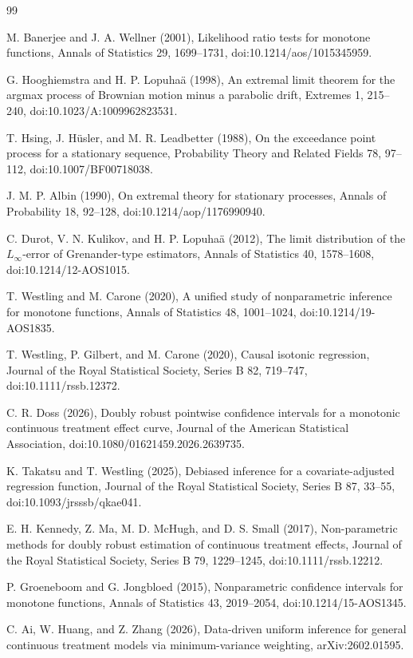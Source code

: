 \documentclass{article}
\begin{document}
\begin{thebibliography}{99}

   M. Banerjee and J. A. Wellner (2001), Likelihood ratio tests for monotone functions, Annals of Statistics 29, 1699--1731, doi:10.1214/aos/1015345959.

   G. Hooghiemstra and H. P. Lopuhaä (1998), An extremal limit theorem for the argmax process of Brownian motion minus a parabolic drift, Extremes 1, 215--240, doi:10.1023/A:1009962823531.

   T. Hsing, J. Hüsler, and M. R. Leadbetter (1988), On the exceedance point process for a stationary sequence, Probability Theory and Related Fields 78, 97--112, doi:10.1007/BF00718038.

   J. M. P. Albin (1990), On extremal theory for stationary processes, Annals of Probability 18, 92--128, doi:10.1214/aop/1176990940.

   C. Durot, V. N. Kulikov, and H. P. Lopuhaä (2012), The limit distribution of the \(L_{\infty}\)-error of Grenander-type estimators, Annals of Statistics 40, 1578--1608, doi:10.1214/12-AOS1015.

   T. Westling and M. Carone (2020), A unified study of nonparametric inference for monotone functions, Annals of Statistics 48, 1001--1024, doi:10.1214/19-AOS1835.

   T. Westling, P. Gilbert, and M. Carone (2020), Causal isotonic regression, Journal of the Royal Statistical Society, Series B 82, 719--747, doi:10.1111/rssb.12372.

   C. R. Doss (2026), Doubly robust pointwise confidence intervals for a monotonic continuous treatment effect curve, Journal of the American Statistical Association, doi:10.1080/01621459.2026.2639735.

   K. Takatsu and T. Westling (2025), Debiased inference for a covariate-adjusted regression function, Journal of the Royal Statistical Society, Series B 87, 33--55, doi:10.1093/jrsssb/qkae041.

   E. H. Kennedy, Z. Ma, M. D. McHugh, and D. S. Small (2017), Non-parametric methods for doubly robust estimation of continuous treatment effects, Journal of the Royal Statistical Society, Series B 79, 1229--1245, doi:10.1111/rssb.12212.

   P. Groeneboom and G. Jongbloed (2015), Nonparametric confidence intervals for monotone functions, Annals of Statistics 43, 2019--2054, doi:10.1214/15-AOS1345.

   C. Ai, W. Huang, and Z. Zhang (2026), Data-driven uniform inference for general continuous treatment models via minimum-variance weighting, arXiv:2602.01595.

\end{thebibliography}
\end{document}
